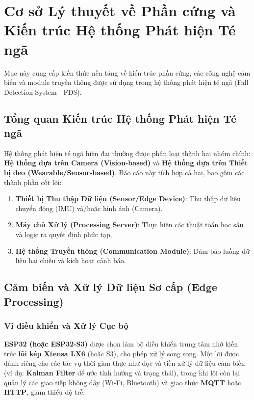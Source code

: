 \section{Cơ sở Lý thuyết về Phần cứng và Kiến trúc Hệ thống Phát hiện Té ngã}
\label{sec:hardware_theory}

Mục này cung cấp kiến thức nền tảng về kiến trúc phần cứng, các công nghệ cảm biến và module truyền thông được sử dụng trong hệ thống phát hiện té ngã (Fall Detection System - FDS).

\subsection{Tổng quan Kiến trúc Hệ thống Phát hiện Té ngã}
Hệ thống phát hiện té ngã hiện đại thường được phân loại thành hai nhóm chính: \textbf{Hệ thống dựa trên Camera (Vision-based)} và \textbf{Hệ thống dựa trên Thiết bị đeo (Wearable/Sensor-based)}. Báo cáo này tích hợp cả hai, bao gồm các thành phần cốt lõi:
\begin{enumerate}
    \item \textbf{Thiết bị Thu thập Dữ liệu (Sensor/Edge Device)}: Thu thập dữ liệu chuyển động (IMU) và/hoặc hình ảnh (Camera).
    \item \textbf{Máy chủ Xử lý (Processing Server)}: Thực hiện các thuật toán học sâu và logic ra quyết định phức tạp.
    \item \textbf{Hệ thống Truyền thông (Communication Module)}: Đảm bảo luồng dữ liệu hai chiều và kích hoạt cảnh báo.
\end{enumerate}

\subsection{Cảm biến và Xử lý Dữ liệu Sơ cấp (Edge Processing)}

\subsubsection{Vi điều khiển và Xử lý Cục bộ}
\textbf{ESP32 (hoặc ESP32-S3)} được chọn làm bộ điều khiển trung tâm nhờ kiến trúc \textbf{lõi kép Xtensa LX6} (hoặc S3), cho phép xử lý song song. Một lõi được dành riêng cho các tác vụ thời gian thực như đọc và tiền xử lý dữ liệu cảm biến (ví dụ: \textbf{Kalman Filter} để ước tính hướng và trạng thái), trong khi lõi còn lại quản lý các giao tiếp không dây (Wi-Fi, Bluetooth) và giao thức \textbf{MQTT} hoặc \textbf{HTTP}, giảm thiểu độ trễ.

